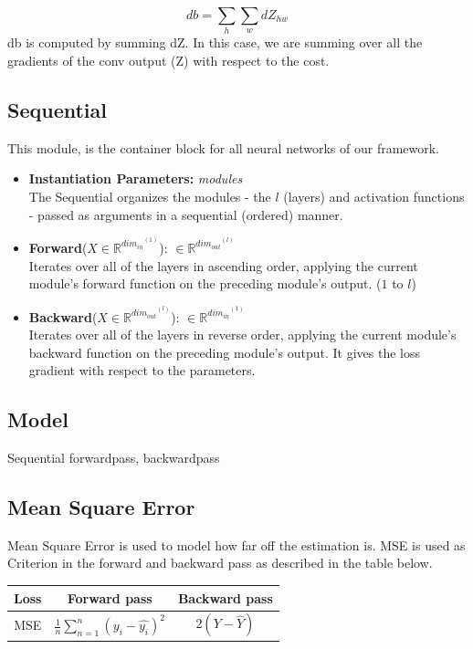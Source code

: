 \documentclass{article}
\begin{document}
\begin{multicols}{2}
\begin{itemize}
\begin{equation}
db = \sum_h \sum_w dZ_{hw} \tag{3}

\end{equation}
db is computed by summing  dZ. In this case, we are summing over all the gradients of the conv output (Z) with respect to the cost.



\subsection{Sequential}
This module, is the container  block for all neural networks of our framework.
\begin{itemize}
    \item \textbf{Instantiation Parameters:} \textit{modules} \\
    The Sequential organizes the modules - the $l$ (layers) and activation functions - passed as arguments in a sequential (ordered) manner.
    \item \textbf{Forward}($X \in \mathbb{R}^{dim_{in}}^{(1)} $): $\in \mathbb{R}^{dim_{out}}^{(l)}$ \\
   Iterates over all of the layers in ascending order, applying the current module's forward function on the preceding module's output.
   ($1$ to $l$)
    \item \textbf{Backward}($X \in \mathbb{R}^{dim_{out}}^{(l)} $): $\in \mathbb{R}^{dim_{in}}^{(1)}$ \\
    Iterates over all of the layers in reverse order, applying the current module's backward function on the preceding module's output. It gives the loss gradient with respect to the parameters.
\end{itemize}

\subsection{Model}
Sequential forwardpass, backwardpass

\subsection{Mean Square Error}
Mean Square Error is used to model how far off the estimation is. MSE is used as Criterion in the forward and backward pass as described in the table below.

\begin{table}[H]
    \centering
    \begin{tabular}{ | c | c | c | } 
        \hline
        Loss & Forward pass & Backward pass \\ [0.5ex]
        \hline
        MSE & $\frac{1}{n}\sum_{n=1}^{n} (y_i - \hat{y_i})^2$ & $2(Y - \hat{Y})$ \\ [1ex]
        \hline
    \end{tabular}
\end{table}


\end{itemize}
\end{multicols}
\end{document}
